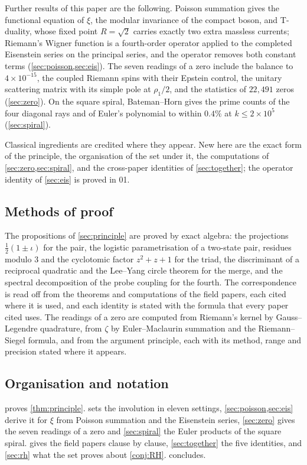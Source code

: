 \documentclass[11pt]{article}
\theoremstyle{definition}\newtheorem{definition}[theorem]{Definition}
\theoremstyle{remark}\newtheorem{remark}[theorem]{Remark}
\begin{document}
Further results of this paper are the following. Poisson summation gives the functional equation of $\xi$, the modular invariance of the compact boson, and T-duality, whose fixed point $R=\sqrt2$ carries exactly two extra massless currents; Riemann's Wigner function is a fourth-order operator applied to the completed Eisenstein series on the principal series, and the operator removes both constant terms (\cref{sec:poisson,sec:eis}). The seven readings of a zero include the balance to $4\times10^{-15}$, the coupled Riemann spins with their Epstein control, the unitary scattering matrix with its simple pole at $\rho_1/2$, and the statistics of $22{,}491$ zeros (\cref{sec:zero}). On the square spiral, Bateman--Horn gives the prime counts of the four diagonal rays and of Euler's polynomial to within $0.4\%$ at $k\le2\times10^5$ (\cref{sec:spiral}).

Classical ingredients are credited where they appear. New here are the exact form of the principle, the organisation of the set under it, the computations of \cref{sec:zero,sec:spiral}, and the cross-paper identities of \cref{sec:together}; the operator identity of \cref{sec:eis} is proved in 01.

\subsection{Methods of proof}
The propositions of \cref{sec:principle} are proved by exact algebra: the projections $\frac12(1\pm\iota)$ for the pair, the logistic parametrisation of a two-state pair, residues modulo $3$ and the cyclotomic factor $z^2+z+1$ for the triad, the discriminant of a reciprocal quadratic and the Lee--Yang circle theorem for the merge, and the spectral decomposition of the probe coupling for the fourth. The correspondence is read off from the theorems and computations of the field papers, each cited where it is used, and each identity is stated with the formula that every paper cited uses. The readings of a zero are computed from Riemann's kernel by Gauss--Legendre quadrature, from $\zeta$ by Euler--Maclaurin summation and the Riemann--Siegel formula, and from the argument principle, each with its method, range and precision stated where it appears.

\subsection{Organisation and notation}
 proves \cref{thm:principle}.  sets the involution in eleven settings, \cref{sec:poisson,sec:eis} derive it for $\xi$ from Poisson summation and the Eisenstein series, \cref{sec:zero} gives the seven readings of a zero and \cref{sec:spiral} the Euler products of the square spiral.  gives the field papers clause by clause, \cref{sec:together} the five identities, and \cref{sec:rh} what the set proves about \cref{conj:RH}.  concludes.
\end{document}
